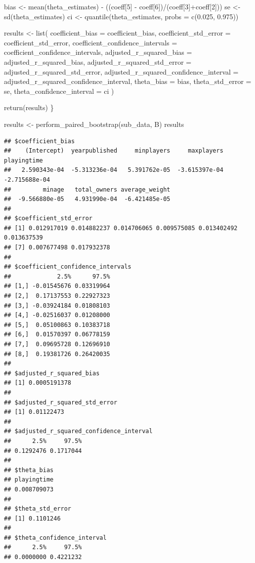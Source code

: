 \documentclass[
]{article}
\newenvironment{Shaded}{\begin{snugshade}}{\end{snugshade}}
\newcommand{\AttributeTok}[1]{\textcolor[rgb]{0.77,0.63,0.00}{#1}}
\newcommand{\DecValTok}[1]{\textcolor[rgb]{0.00,0.00,0.81}{#1}}
\newcommand{\FloatTok}[1]{\textcolor[rgb]{0.00,0.00,0.81}{#1}}
\newcommand{\FunctionTok}[1]{\textcolor[rgb]{0.00,0.00,0.00}{#1}}
\newcommand{\NormalTok}[1]{#1}
\newcommand{\OtherTok}[1]{\textcolor[rgb]{0.56,0.35,0.01}{#1}}
\newcommand{\SpecialCharTok}[1]{\textcolor[rgb]{0.00,0.00,0.00}{#1}}
\begin{document}
\begin{Shaded}
\begin{Highlighting}[]
\NormalTok{  bias }\OtherTok{\textless{}{-}} \FunctionTok{mean}\NormalTok{(theta\_estimates) }\SpecialCharTok{{-}}\NormalTok{ ((coeff[}\DecValTok{5}\NormalTok{] }\SpecialCharTok{{-}}\NormalTok{ coeff[}\DecValTok{6}\NormalTok{])}\SpecialCharTok{/}\NormalTok{(coeff[}\DecValTok{3}\NormalTok{]}\SpecialCharTok{+}\NormalTok{coeff[}\DecValTok{2}\NormalTok{]))}
\NormalTok{  se }\OtherTok{\textless{}{-}} \FunctionTok{sd}\NormalTok{(theta\_estimates)}
\NormalTok{  ci }\OtherTok{\textless{}{-}} \FunctionTok{quantile}\NormalTok{(theta\_estimates, }\AttributeTok{probs =} \FunctionTok{c}\NormalTok{(}\FloatTok{0.025}\NormalTok{, }\FloatTok{0.975}\NormalTok{))}
  
\NormalTok{  results }\OtherTok{\textless{}{-}} \FunctionTok{list}\NormalTok{(}
    \AttributeTok{coefficient\_bias =}\NormalTok{ coefficient\_bias,}
    \AttributeTok{coefficient\_std\_error =}\NormalTok{ coefficient\_std\_error,}
    \AttributeTok{coefficient\_confidence\_intervals =}\NormalTok{ coefficient\_confidence\_intervals,}
    \AttributeTok{adjusted\_r\_squared\_bias =}\NormalTok{ adjusted\_r\_squared\_bias,}
    \AttributeTok{adjusted\_r\_squared\_std\_error =}\NormalTok{ adjusted\_r\_squared\_std\_error,}
    \AttributeTok{adjusted\_r\_squared\_confidence\_interval =}\NormalTok{ adjusted\_r\_squared\_confidence\_interval,}
    \AttributeTok{theta\_bias =}\NormalTok{ bias,}
    \AttributeTok{theta\_std\_error =}\NormalTok{ se,}
    \AttributeTok{theta\_confidence\_interval =}\NormalTok{ ci}
\NormalTok{  )}
  
  \FunctionTok{return}\NormalTok{(results)}
\NormalTok{\}}

\NormalTok{results }\OtherTok{\textless{}{-}} \FunctionTok{perform\_paired\_bootstrap}\NormalTok{(sub\_data, B)}
\NormalTok{results}
\end{Highlighting}
\end{Shaded}

\begin{verbatim}
## $coefficient_bias
##    (Intercept)  yearpublished     minplayers     maxplayers    playingtime 
##   2.590343e-04  -5.313236e-04   5.391762e-05  -3.615397e-04  -2.715688e-04 
##         minage   total_owners average_weight 
##  -9.566880e-05   4.931990e-04  -6.421485e-05 
## 
## $coefficient_std_error
## [1] 0.012917019 0.014882237 0.014706065 0.009575085 0.013402492 0.013637539
## [7] 0.007677498 0.017932378
## 
## $coefficient_confidence_intervals
##             2.5%      97.5%
## [1,] -0.01545676 0.03319964
## [2,]  0.17137553 0.22927323
## [3,] -0.03924184 0.01808103
## [4,] -0.02516037 0.01208000
## [5,]  0.05100863 0.10383718
## [6,]  0.01570397 0.06778159
## [7,]  0.09695728 0.12696910
## [8,]  0.19381726 0.26420035
## 
## $adjusted_r_squared_bias
## [1] 0.0005191378
## 
## $adjusted_r_squared_std_error
## [1] 0.01122473
## 
## $adjusted_r_squared_confidence_interval
##      2.5%     97.5% 
## 0.1292476 0.1717044 
## 
## $theta_bias
## playingtime 
## 0.008709073 
## 
## $theta_std_error
## [1] 0.1101246
## 
## $theta_confidence_interval
##      2.5%     97.5% 
## 0.0000000 0.4221232
\end{verbatim}
\end{document}
